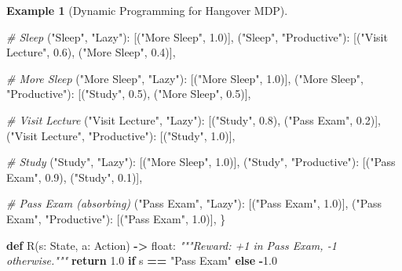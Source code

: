 \documentclass[
]{book}
\newenvironment{Shaded}{\begin{snugshade}}{\end{snugshade}}
\newcommand{\BuiltInTok}[1]{#1}
\newcommand{\CommentTok}[1]{\textcolor[rgb]{0.56,0.35,0.01}{\textit{#1}}}
\newcommand{\ControlFlowTok}[1]{\textcolor[rgb]{0.13,0.29,0.53}{\textbf{#1}}}
\newcommand{\FloatTok}[1]{\textcolor[rgb]{0.00,0.00,0.81}{#1}}
\newcommand{\KeywordTok}[1]{\textcolor[rgb]{0.13,0.29,0.53}{\textbf{#1}}}
\newcommand{\NormalTok}[1]{#1}
\newcommand{\OperatorTok}[1]{\textcolor[rgb]{0.81,0.36,0.00}{\textbf{#1}}}
\newcommand{\StringTok}[1]{\textcolor[rgb]{0.31,0.60,0.02}{#1}}
\theoremstyle{definition}
\theoremstyle{definition}
\newtheorem{example}{Example}[chapter]
\theoremstyle{definition}
\theoremstyle{definition}
\theoremstyle{remark}
\begin{document}
\begin{example}[Dynamic Programming for Hangover MDP]
\begin{Shaded}
\begin{Highlighting}[]
    \CommentTok{\# Sleep}
\NormalTok{    (}\StringTok{"Sleep"}\NormalTok{, }\StringTok{"Lazy"}\NormalTok{):          [(}\StringTok{"More Sleep"}\NormalTok{, }\FloatTok{1.0}\NormalTok{)],}
\NormalTok{    (}\StringTok{"Sleep"}\NormalTok{, }\StringTok{"Productive"}\NormalTok{):    [(}\StringTok{"Visit Lecture"}\NormalTok{, }\FloatTok{0.6}\NormalTok{), (}\StringTok{"More Sleep"}\NormalTok{, }\FloatTok{0.4}\NormalTok{)],}

    \CommentTok{\# More Sleep}
\NormalTok{    (}\StringTok{"More Sleep"}\NormalTok{, }\StringTok{"Lazy"}\NormalTok{):       [(}\StringTok{"More Sleep"}\NormalTok{, }\FloatTok{1.0}\NormalTok{)],}
\NormalTok{    (}\StringTok{"More Sleep"}\NormalTok{, }\StringTok{"Productive"}\NormalTok{): [(}\StringTok{"Study"}\NormalTok{, }\FloatTok{0.5}\NormalTok{), (}\StringTok{"More Sleep"}\NormalTok{, }\FloatTok{0.5}\NormalTok{)],}

    \CommentTok{\# Visit Lecture}
\NormalTok{    (}\StringTok{"Visit Lecture"}\NormalTok{, }\StringTok{"Lazy"}\NormalTok{):       [(}\StringTok{"Study"}\NormalTok{, }\FloatTok{0.8}\NormalTok{), (}\StringTok{"Pass Exam"}\NormalTok{, }\FloatTok{0.2}\NormalTok{)],}
\NormalTok{    (}\StringTok{"Visit Lecture"}\NormalTok{, }\StringTok{"Productive"}\NormalTok{): [(}\StringTok{"Study"}\NormalTok{, }\FloatTok{1.0}\NormalTok{)],}

    \CommentTok{\# Study}
\NormalTok{    (}\StringTok{"Study"}\NormalTok{, }\StringTok{"Lazy"}\NormalTok{):         [(}\StringTok{"More Sleep"}\NormalTok{, }\FloatTok{1.0}\NormalTok{)],}
\NormalTok{    (}\StringTok{"Study"}\NormalTok{, }\StringTok{"Productive"}\NormalTok{):   [(}\StringTok{"Pass Exam"}\NormalTok{, }\FloatTok{0.9}\NormalTok{), (}\StringTok{"Study"}\NormalTok{, }\FloatTok{0.1}\NormalTok{)],}

    \CommentTok{\# Pass Exam (absorbing)}
\NormalTok{    (}\StringTok{"Pass Exam"}\NormalTok{, }\StringTok{"Lazy"}\NormalTok{):       [(}\StringTok{"Pass Exam"}\NormalTok{, }\FloatTok{1.0}\NormalTok{)],}
\NormalTok{    (}\StringTok{"Pass Exam"}\NormalTok{, }\StringTok{"Productive"}\NormalTok{): [(}\StringTok{"Pass Exam"}\NormalTok{, }\FloatTok{1.0}\NormalTok{)],}
\NormalTok{\}}

\KeywordTok{def}\NormalTok{ R(s: State, a: Action) }\OperatorTok{{-}\textgreater{}} \BuiltInTok{float}\NormalTok{:}
    \CommentTok{"""Reward: +1 in Pass Exam, {-}1 otherwise."""}
    \ControlFlowTok{return} \FloatTok{1.0} \ControlFlowTok{if}\NormalTok{ s }\OperatorTok{==} \StringTok{"Pass Exam"} \ControlFlowTok{else} \OperatorTok{{-}}\FloatTok{1.0}


\end{Highlighting}
\end{Shaded}
\end{example}
\end{document}
